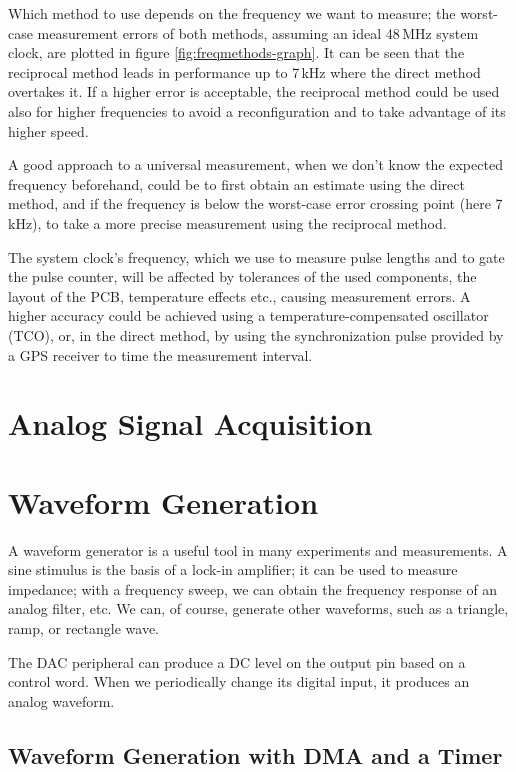 Which method to use depends on the frequency we want to measure; the worst-case measurement errors of both methods, assuming an ideal 48\,MHz system clock, are plotted in figure \ref{fig:freqmethods-graph}. It can be seen that the reciprocal method leads in performance up to 7\,kHz where the direct method overtakes it. If a higher error is acceptable, the reciprocal method could be used also for higher frequencies to avoid a reconfiguration and to take advantage of its higher speed.

A good approach to a universal measurement, when we don't know the expected frequency beforehand, could be to first obtain an estimate using the direct method, and if the frequency is below the worst-case error crossing point (here 7\,kHz), to take a more precise measurement using the reciprocal method.

The system clock's frequency, which we use to measure pulse lengths and to gate the pulse counter, will be affected by tolerances of the used components, the layout of the PCB, temperature effects etc., causing measurement errors. A higher accuracy could be achieved using a temperature-compensated oscillator (TCO), or, in the direct method, by using the synchronization pulse provided by a GPS receiver to time the measurement interval.


\section{Analog Signal Acquisition} \label{sec:theory-adc}



\section{Waveform Generation} \label{sec:theory-dac}

A waveform generator is a useful tool in many experiments and measurements. A sine stimulus is the basis of a lock-in amplifier; it can be used to measure impedance; with a frequency sweep, we can obtain the frequency response of an analog filter, etc. We can, of course, generate other waveforms, such as a triangle, ramp, or rectangle wave.

The DAC peripheral can produce a DC level on the output pin based on a control word. When we periodically change its digital input, it produces an analog waveform. 

\subsection{Waveform Generation with DMA and a Timer} \label{sec:theory-dac-simple}

